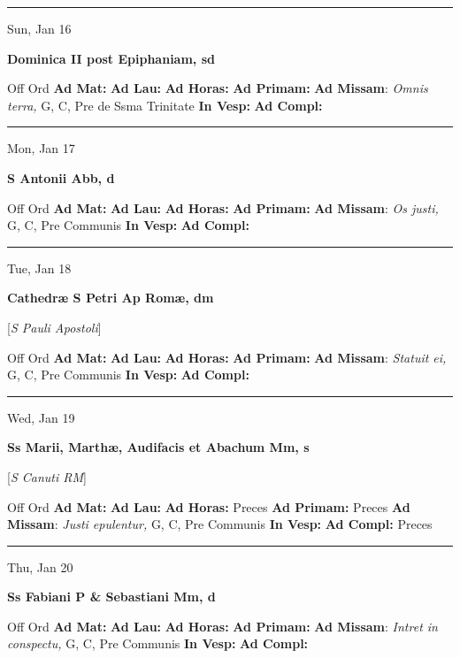 \documentclass[letterpaper, 10pt]{article}
\begin{document}
\hrule
\begin{center}
Sun, Jan 16
\end{center}\textbf{ \large Dominica II post Epiphaniam, \textnormal{\normalsize sd}}
\begin{justify}
Off Ord
\textbf{Ad Mat: }
\textbf{Ad Lau: }
\textbf{Ad Horas: }
\textbf{Ad Primam: }
\textbf{Ad Missam}: \textit{Omnis terra,} G, C, Pre de Ssma Trinitate
\textbf{In Vesp: }
\textbf{Ad Compl: }\end{justify}



\hrule
\begin{center}
Mon, Jan 17
\end{center}\textbf{ \large S Antonii Abb, \textnormal{\normalsize d}}
\begin{justify}
Off Ord
\textbf{Ad Mat: }
\textbf{Ad Lau: }
\textbf{Ad Horas: }
\textbf{Ad Primam: }
\textbf{Ad Missam}: \textit{Os justi,} G, C, Pre Communis
\textbf{In Vesp: }
\textbf{Ad Compl: }\end{justify}



\hrule
\begin{center}
Tue, Jan 18
\end{center}\textbf{ \large Cathedræ S Petri Ap Romæ, \textnormal{\normalsize dm}}

[\textit{S Pauli Apostoli}]
\begin{justify}
Off Ord
\textbf{Ad Mat: }
\textbf{Ad Lau: }
\textbf{Ad Horas: }
\textbf{Ad Primam: }
\textbf{Ad Missam}: \textit{Statuit ei,} G, C, Pre Communis
\textbf{In Vesp: }
\textbf{Ad Compl: }\end{justify}



\hrule
\begin{center}
Wed, Jan 19
\end{center}\textbf{ \large Ss Marii, Marthæ, Audifacis et Abachum Mm, \textnormal{\normalsize s}}

[\textit{S Canuti RM}]
\begin{justify}
Off Ord
\textbf{Ad Mat: }
\textbf{Ad Lau: }
\textbf{Ad Horas: }Preces
\textbf{Ad Primam: }Preces
\textbf{Ad Missam}: \textit{Justi epulentur,} G, C, Pre Communis
\textbf{In Vesp: }
\textbf{Ad Compl: }Preces\end{justify}



\hrule
\begin{center}
Thu, Jan 20
\end{center}\textbf{ \large Ss Fabiani P \& Sebastiani Mm, \textnormal{\normalsize d}}
\begin{justify}
Off Ord
\textbf{Ad Mat: }
\textbf{Ad Lau: }
\textbf{Ad Horas: }
\textbf{Ad Primam: }
\textbf{Ad Missam}: \textit{Intret in conspectu,} G, C, Pre Communis
\textbf{In Vesp: }
\textbf{Ad Compl: }\end{justify}
\end{document}
